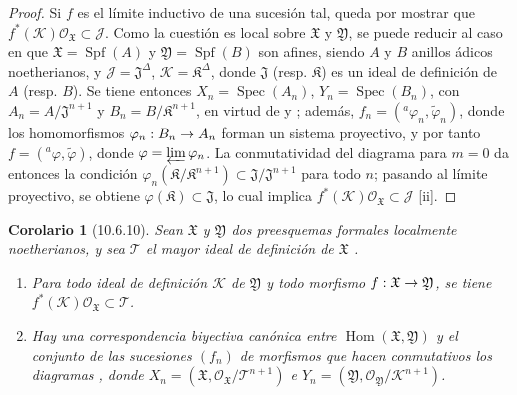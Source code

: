 \documentclass[oneside]{amsart}
\theoremstyle{ega-env-style}
\theoremstyle{ega-thm-env-style}
\newtheorem*{corollary}{Corolario}
\theoremstyle{ega-defn-env-style}
\renewcommand{\to}{\mathchoice{\longrightarrow}{\rightarrow}{\rightarrow}{\rightarrow}}
\let\EGAOriginalLabel\label
\renewcommand{\label}[1]{\phantomsection\EGAOriginalLabel{#1}}
\begin{document}
\begin{proof}
Si $f$ es el límite inductivo de una sucesión tal, queda por mostrar que $f^*(\mathscr{K})\mathscr{O}_{\mathfrak{X}}\subset\mathscr{J}$.
Como la cuestión es local sobre $\mathfrak{X}$ y $\mathfrak{Y}$, se puede reducir al caso en que $\mathfrak{X}=\operatorname{Spf}(A)$ y $\mathfrak{Y}=\operatorname{Spf}(B)$ son afines, siendo $A$ y $B$ anillos ádicos noetherianos, y $\mathscr{J}=\mathfrak{J}^\Delta$, $\mathscr{K}=\mathfrak{K}^\Delta$, donde $\mathfrak{J}$ (resp. $\mathfrak{K}$) es un ideal de definición de $A$ (resp. $B$).
Se tiene entonces $X_n=\operatorname{Spec}(A_n)$, $Y_n=\operatorname{Spec}(B_n)$, con $A_n=A/\mathfrak{J}^{n+1}$ y $B_n=B/\mathfrak{K}^{n+1}$, en virtud de  y ; además, $f_n=({}^a\varphi_n,\widetilde{\varphi}_n)$, donde los homomorfismos $\varphi_n:B_n\to A_n$ forman un sistema proyectivo, y por tanto $f=({}^a\varphi,\widetilde{\varphi})$, donde $\varphi=\varprojlim\varphi_n$.
La conmutatividad del diagrama  para $m=0$ da entonces la condición $\varphi_n(\mathfrak{K}/\mathfrak{K}^{n+1})
\subset\mathfrak{J}/\mathfrak{J}^{n+1}$ para todo $n$; pasando al límite proyectivo, se obtiene $\varphi(\mathfrak{K})\subset
\mathfrak{J}$, lo cual implica $f^*(\mathscr{K})\mathscr{O}_{\mathfrak{X}}\subset\mathscr{J}$ [ii].
\end{proof}

\begin{corollary}[10.6.10]
\label{I.10.6.10}
Sean $\mathfrak{X}$ y $\mathfrak{Y}$ dos preesquemas formales localmente noetherianos, y sea $\mathscr{T}$ el mayor ideal de definición de $\mathfrak{X}$ .
\begin{enumerate}
  \item[\rm{(i)}] Para todo ideal de definición $\mathscr{K}$ de $\mathfrak{Y}$ y todo morfismo $f:\mathfrak{X}\to\mathfrak{Y}$, se tiene $f^*(\mathscr{K})\mathscr{O}_{\mathfrak{X}}\subset\mathscr{T}$.
  \item[\rm{(ii)}] Hay una correspondencia biyectiva canónica entre $\operatorname{Hom}(\mathfrak{X},\mathfrak{Y})$ y el conjunto de las sucesiones $(f_n)$ de morfismos que hacen conmutativos los diagramas , donde $X_n=(\mathfrak{X},
  \mathscr{O}_{\mathfrak{X}}/\mathscr{T}^{n+1})$ e $Y_n=(\mathfrak{Y},
  \mathscr{O}_{\mathfrak{Y}}/\mathscr{K}^{n+1})$.
\end{enumerate}
\end{corollary}
\end{document}
